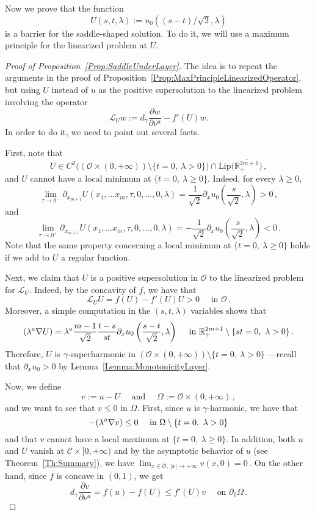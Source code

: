 \documentclass[12pt,reqno]{amsart}
\theoremstyle{definition}
\theoremstyle{remark}
\newcommand{\con}[1]{\mathbb{#1}}
\newcommand{\R}{\con{R}} %
\newcommand{\ccal}{\mathscr{C}}
\newcommand{\ocal}{\mathcal{O}}
\newcommand{\s}{\gamma}
\newcommand{\Lip}{\mathrm{Lip}}
\newcommand{\bpar}[1]{\left ( {#1}\right )}
\let\div\relax
\DeclareMathOperator{\div}{div}
\numberwithin{equation}{section}
\begin{document}
Now we prove that the function 
$$
U(s,t,\lambda) := u_0 ( (s-t)/\sqrt{2}, \lambda)
$$ 
is a barrier for the saddle-shaped solution. To do it, we will use a maximum principle for the linearized problem at $U$.


\begin{proof}[Proof of Proposition~\ref{Prop:SaddleUnderLayer}]
The idea is to repeat the arguments in the proof of Proposition~\ref{Prop:MaxPrincipleLinearizedOperator}, but using $U$ instead of $u$ as the positive supersolution to the linearized problem involving the operator 
$$
\mathscr{L}_U w:= d_\s \dfrac{\partial w}{\partial \nu^a}  -f'(U)w. 
$$ 
In order to do it, we need to point out several facts.
	
First, note that 
$$
U\in C^2\big( (\ocal\times (0,+\infty))\setminus \{t=0,\ \lambda > 0\} \big ) \cap \Lip \big( \overline{\R^{2m+1}_+}\big )\,,
$$
and $U$ cannot have a local minimum at $\{t=0,\ \lambda \geq 0\}$. Indeed, for every $\lambda \geq 0$,
$$
\lim_{\tau\to 0^-} \partial_{x_{m+1}}  U(x_1,...x_m,\tau,0,...,0,\lambda) = \frac{1}{\sqrt{2}}\partial_xu_0\left(\frac{s}{\sqrt{2}},\lambda\right)>0\,, 
$$
and
$$
\lim_{\tau\to 0^+} \partial_{x_{m+1}} U(x_1,...x_m,\tau,0,...,0,\lambda) = -\frac{1}{\sqrt{2}}\partial_xu_0\left(\frac{s}{\sqrt{2}},\lambda\right) <0\,.
$$
Note that the same property concerning a local minimum at $\{t=0,\ \lambda \geq 0\}$ holds if we add to $U$ a regular function.

Next, we claim that $U$ is a positive supersolution in $\ocal$ to the linearized problem for $\mathscr{L}_U$. Indeed, by the concavity of $f$, we have that
$$
\mathscr{L}_U U  = f(U) - f'(U)U> 0 \quad \text{ in } \ocal\,.
$$
Moreover, a simple computation in the $(s, t, \lambda)$ variables shows that
\begin{equation}
\label{Eq:EqForULayer}
\div (\lambda^a \nabla U) = \lambda^a \dfrac{m-1}{\sqrt{2}} \dfrac{t-s}{st} \partial_x u_0 \bpar{\dfrac{s-t}{\sqrt{2}}, \lambda}  \quad \text{ in } \R^{2m + 1}_+ \setminus \{st=0,\ \lambda >0\}\,.
\end{equation}
Therefore, $U$ is $\s$-superharmonic in $ (\ocal \times (0, +\infty) )\setminus \{t=0,\ \lambda > 0\}$ ---recall that $ \partial_x u_0 > 0$ by Lemma~\ref{Lemma:MonotonicityLayer}. 


Now, we define 
$$ v:= u - U \quad \text{ and } \quad \Omega :=  \ocal \times (0, +\infty)\,,
$$
and we want to see that $v\leq 0$ in $\Omega$. First, since $u$ is $\s$-harmonic, we have that 
$$ 
-\div (\lambda^a \nabla v) \leq 0 \quad \text{ in }\Omega \setminus \{t=0,\ \lambda > 0\}
$$
and that $v$ cannot have a local maximum at $\{t=0,\ \lambda \geq 0\}$. In addition, both $u$ and $U$ vanish at $\ccal \times [0,+\infty)$ and by the asymptotic behavior of $u$ (see Theorem~\ref{Th:Summary}), we have $\lim_{x\in  \ocal,\ |x|\to +\infty} v(x,0) = 0\,$. On the other hand, since $f$ is concave in $(0,1)$, we get 
$$
d_\s \dfrac{\partial v}{\partial \nu^a}  = f(u) - f(U) \leq f'(U)v \quad \text{ on } \partial_0 \Omega\,.
$$



\end{proof}
\end{document}
